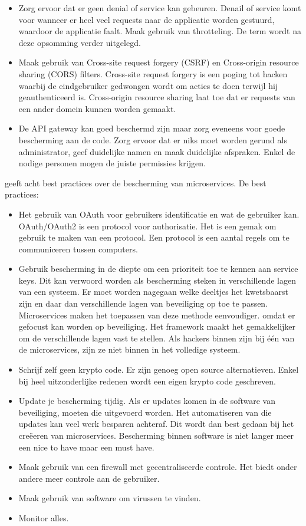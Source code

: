 \begin{itemize}
	\item Zorg ervoor dat er geen denial of service kan gebeuren. Denail of service komt voor wanneer er heel veel requests naar de applicatie worden gestuurd, waardoor de applicatie faalt. Maak gebruik van throtteling. De term wordt na deze opsomming verder uitgelegd.
	\item Maak gebruik van Cross-site request forgery (CSRF) en Cross-origin resource sharing (CORS) filters. Cross-site request forgery is een poging tot hacken waarbij de eindgebruiker gedwongen wordt om acties te doen terwijl hij geauthenticeerd is. Cross-origin resource sharing laat toe dat er requests van een ander domein kunnen worden gemaakt. 
	\item De API gateway kan goed beschermd zijn maar zorg eveneens voor goede bescherming aan de code. Zorg ervoor dat er niks moet worden gerund als administrator, geef duidelijke namen en maak duidelijke afspraken. Enkel de nodige personen mogen de juiste permissies krijgen. 
\end{itemize}

\textcite{Troisi2019} geeft acht best practices over de bescherming van microservices. 
De best practices:
\begin{itemize}
	\item Het gebruik van OAuth voor gebruikers identificatie en wat de gebruiker kan. OAuth/OAuth2 is een protocol voor authorisatie. Het is een gemak om gebruik te maken van een protocol. Een protocol is een aantal regels om te communiceren tussen computers. 
	\item Gebruik bescherming in de diepte om een prioriteit toe te kennen aan service keys.  Dit kan verwoord worden als bescherming steken in verschillende lagen van een systeem. Er moet worden nagegaan  welke deeltjes het kwetsbaarst zijn en daar dan verschillende lagen van beveiliging op toe te passen. 
	Microservices maken het toepassen van deze methode eenvoudiger. omdat er gefocust kan worden op beveiliging. Het framework maakt het gemakkelijker om de verschillende lagen vast te stellen. Als hackers binnen zijn bij één van de microservices, zijn ze niet binnen in het volledige systeem. 
	\item Schrijf zelf geen krypto code. Er zijn genoeg open source alternatieven. Enkel bij heel uitzonderlijke redenen wordt een eigen krypto code geschreven. 
	\item Update je bescherming tijdig. Als er updates komen in de software van beveiliging, moeten die uitgevoerd worden. Het automatiseren van die updates kan veel  werk besparen achteraf. Dit wordt dan best gedaan bij het creëeren van microservices. Bescherming binnen software is niet langer meer een nice to have maar een must have. 
	\item Maak gebruik van een firewall met gecentraliseerde controle. Het biedt onder andere meer controle aan de gebruiker. 
	\item Maak gebruik van software om virussen te vinden.
	\item Monitor alles.
\end{itemize}

